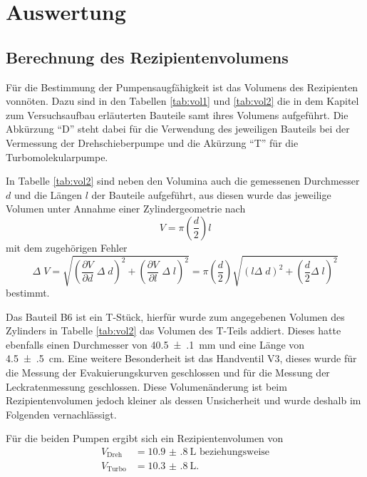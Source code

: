 \newpage
\section{Auswertung}
\label{sec:Auswertung}

\subsection{Berechnung des Rezipientenvolumens}
\label{sec:Volumina}

Für die Bestimmung der Pumpensaugfähigkeit ist das Volumens des Rezipienten
vonnöten. Dazu sind in den Tabellen \ref{tab:vol1} und \ref{tab:vol2} die
in dem Kapitel zum Versuchsaufbau erläuterten Bauteile samt ihres Volumens aufgeführt.
Die Abkürzung \enquote{D} steht dabei für die Verwendung
des jeweiligen Bauteils bei der Vermessung der
Drehschieberpumpe und die Akürzung \enquote{T} für die Turbomolekularpumpe.



In Tabelle \ref{tab:vol2} sind neben den Volumina auch die gemessenen
Durchmesser $d$ und die Längen $l$ der Bauteile aufgeführt, aus diesen wurde
das jeweilige Volumen unter Annahme einer Zylindergeometrie nach
\begin{equation*}
  V = \pi \left(\frac{d}{2}\right) l
\end{equation*}
mit dem zugehörigen Fehler
\begin{equation*}
  \Delta \; V =
  \sqrt{\left(\frac{\partial V}{\partial d} \;\Delta \; d\right)^2 +
  \left(\frac{\partial V}{\partial l} \;\Delta \; l\right)^2} =
  \pi \left(\frac{d}{2}\right) \sqrt{
  \left(l \Delta \; d \right)^2 +
  \left( \frac{d}{2} \Delta \; l\right)^2}
\end{equation*}
bestimmt.



Das Bauteil B6 ist ein T-Stück, hierfür wurde zum angegebenen Volumen des Zylinders
in Tabelle \ref{tab:vol2}
das Volumen des T-Teils addiert. Dieses hatte ebenfalls einen Durchmesser
von \SI{40.5(1)}{\milli\meter} und eine Länge von \SI{4.5(5)}{\centi\meter}.
Eine weitere Besonderheit ist das Handventil V3, dieses wurde für die Messung
der Evakuierungskurven geschlossen und für die Messung der Leckratenmessung
geschlossen. Diese Volumenänderung ist beim Rezipientenvolumen jedoch kleiner
als dessen Unsicherheit und
wurde deshalb im Folgenden vernachlässigt.

Für die beiden Pumpen ergibt sich ein Rezipientenvolumen von
\begin{align*}
  V_\text{Dreh} &= \SI{10.9(8)}{\liter} \text{ beziehungsweise}\\
  V_\text{Turbo} &= \SI{10.3(8)}{\liter}.
\end{align*}


